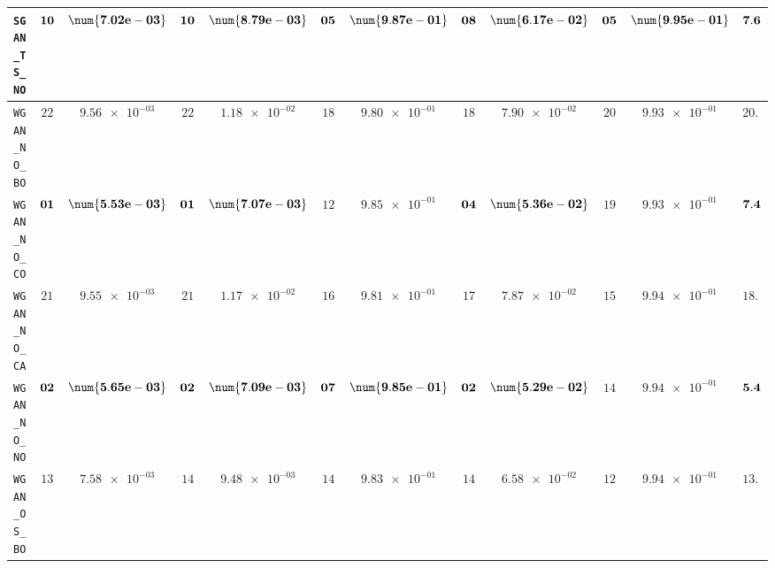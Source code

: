 \begin{table}[H]
\begin{tabularx}{\textwidth}{l||cC|cC|cC|cC|cC||c}
		\texttt{SGAN\_TS\_NO} & $\bf 10$ & $\bf \num{7.02e-03}$ & $\bf 10$ & $\bf \num{8.79e-03}$ & $\bf 05$ & $\bf \num{9.87e-01}$ & $\bf 08$ & $\bf \num{6.17e-02}$ & $\bf 05$ & $\bf \num{9.95e-01}$ & $\bf 7.6$  \\ \hline
		\texttt{WGAN\_NO\_BO} & $ 22$ & $ \num{9.56e-03}$ & $ 22$ & $ \num{1.18e-02}$ & $ 18$ & $ \num{9.80e-01}$ & $ 18$ & $ \num{7.90e-02}$ & $ 20$ & $ \num{9.93e-01}$ & $ 20.0$  \\
		\texttt{WGAN\_NO\_CO} & $\bf 01$ & $\bf \num{5.53e-03}$ & $\bf 01$ & $\bf \num{7.07e-03}$ & $ 12$ & $ \num{9.85e-01}$ & $\bf 04$ & $\bf \num{5.36e-02}$ & $ 19$ & $ \num{9.93e-01}$ & $\bf 7.4$  \\
		\texttt{WGAN\_NO\_CA} & $ 21$ & $ \num{9.55e-03}$ & $ 21$ & $ \num{1.17e-02}$ & $ 16$ & $ \num{9.81e-01}$ & $ 17$ & $ \num{7.87e-02}$ & $ 15$ & $ \num{9.94e-01}$ & $ 18.0$  \\
		\texttt{WGAN\_NO\_NO} & $\bf 02$ & $\bf \num{5.65e-03}$ & $\bf 02$ & $\bf \num{7.09e-03}$ & $\bf 07$ & $\bf \num{9.85e-01}$ & $\bf 02$ & $\bf \num{5.29e-02}$ & $ 14$ & $ \num{9.94e-01}$ & $\bf 5.4$  \\
		\texttt{WGAN\_OS\_BO} & $ 13$ & $ \num{7.58e-03}$ & $ 14$ & $ \num{9.48e-03}$ & $ 14$ & $ \num{9.83e-01}$ & $ 14$ & $ \num{6.58e-02}$ & $ 12$ & $ \num{9.94e-01}$ & $ 13.4$  \\

\end{tabularx}
\end{table}
